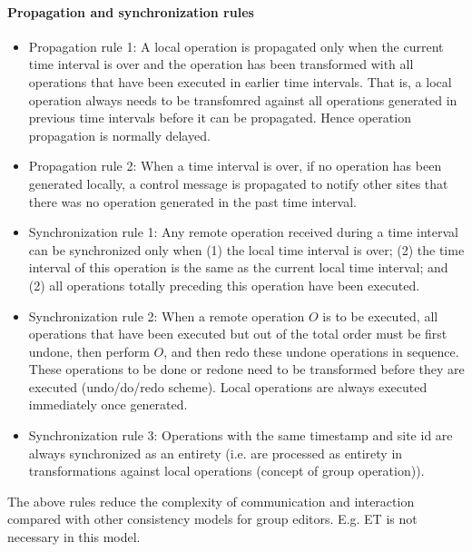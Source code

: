 \paragraph{Propagation and synchronization rules}
\begin{itemize}
 \item Propagation rule 1: A local operation is propagated only when the current time interval is over and the operation has been transformed with all operations that have been executed in earlier time intervals. That is, a local operation always needs to be transfomred against all operations generated in previous time intervals before it can be propagated. Hence operation propagation is normally delayed.
 \item Propagation rule 2: When a time interval is over, if no operation has been generated locally, a control message is propagated to notify other sites that there was no operation generated in the past time interval. 
 \item Synchronization rule 1: Any remote operation received during a time interval can be synchronized only when (1) the local time interval is over; (2) the time interval of this operation is the same as the current local time interval; and (2) all operations totally preceding this operation have been executed.
 \item Synchronization rule 2: When a remote operation $O$ is to be executed, all operations that have been executed but out of the total order must be first undone, then perform $O$, and then redo these undone operations in sequence. These operations to be done or redone need to be transformed before they are executed (undo/do/redo scheme). Local operations are always executed immediately once generated.
 \item Synchronization rule 3: Operations with the same timestamp and site id are always synchronized as an entirety (i.e. are processed as entirety in transformations against local operations (concept of group operation)).
\end{itemize}
The above rules reduce the complexity of communication and interaction compared with other consistency models for group editors. E.g. ET is not necessary in this model.


